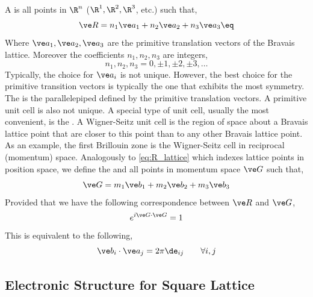 \documentclass{article}
\begin{document}
A  is all points in $\R^{n}$ ($\R^{1}, \R^{2}, \R^{3}$, etc.) such that,
\[ \ve R = n_1 \ve a_1 + n_2 \ve a_2 + n_3 \ve a_3 \eq \label{eq:R_lattice} \]
Where $\ve a_1, \ve a_2, \ve a_3$ are the primitive translation vectors of the Bravais lattice. Moreover the coefficients $n_1, n_2, n_3$ are integers,
\[ n_1, n_2, n_3 = 0, \pm 1, \pm 2, \pm 3, \ldots \]
Typically, the choice for $\ve a_i$ is not unique. However, the best choice for the primitive transition vectors is typically the one that exhibits the most symmetry. \\

The  is the parallelepiped defined by the primitive translation vectors. A primitive unit cell is also not unique. A special type of unit cell, usually the most convenient, is the . A Wigner-Seitz unit cell is the region of space about a Bravais lattice point that are closer to this point than to any other Bravais lattice point. As an example, the first Brillouin zone is the Wigner-Seitz cell in reciprocal (momentum) space. Analogously to \cref{eq:R_lattice} which indexes lattice points in position space, we define the  and all points in momentum space $\ve G$ such that,
\[ \ve G = m_1 \ve b_1 + m_2 \ve b_2 + m_3 \ve b_3\]
Provided that we have the following correspondence between $\ve R$ and $\ve G$,
\[ e^{i \ve G \cdot \ve G} = 1 \]
This is equivalent to the following,
\[ \ve b_{i} \cdot \ve a_{j} = 2 \pi \de_{ij} \qquad \forall i,j \]

\subsection{Electronic Structure for Square Lattice}
\end{document}
